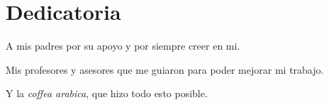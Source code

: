 
\chapter*{Dedicatoria}


A mis padres por su apoyo y por siempre creer en mi.

Mis profesores y asesores que me guiaron para poder mejorar mi trabajo.

Y la \textit{coffea arabica}, que hizo todo esto posible.


